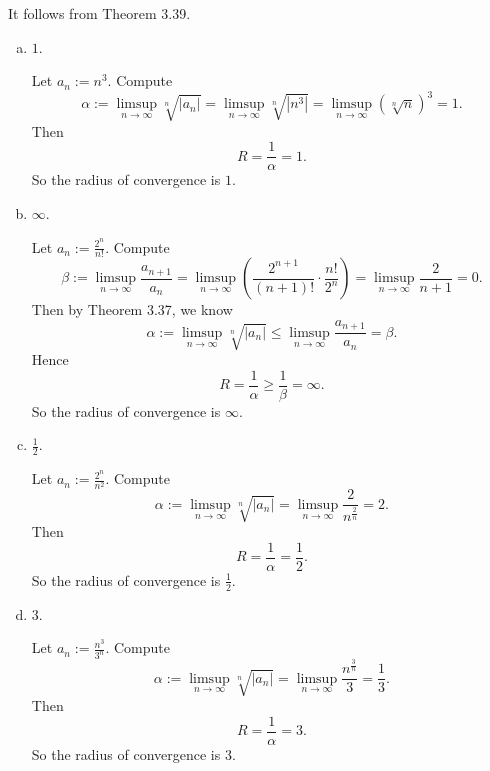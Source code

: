 \begin{Exercise}
	It follows from Theorem 3.39.
	\begin{enumerate}[(a)]
		\item
		\begin{answer}
			$1$.
		\end{answer}
		\begin{solution}
			Let $a_n := n^3$. Compute
			$$
			\alpha := \limsup_{n\to\infty} \sqrt[n]{|a_n|}
			= \limsup_{n\to\infty} \sqrt[n]{|n^3|}
			=\limsup_{n\to\infty} (\sqrt[n]{n})^3
			= 1.
			$$
			Then
			$$
			R = \frac{1}{\alpha}
			= 1.
			$$
			So the radius of convergence is $1$.
		\end{solution}
		
		\item
		\begin{answer}
			$\infty$.
		\end{answer}
		\begin{solution}
			Let $a_n := \frac{2^n}{n!}$.
			Compute
			$$
			\beta := \limsup_{n\to\infty}\frac{a_{n+1}}{a_n}
			= \limsup_{n\to\infty}\left( \frac{2^{n+1}}{(n+1)!} \cdot \frac{n!}{2^n} \right) 
			= \limsup_{n\to\infty} \frac{2}{n+1}
			= 0.
			$$
			Then by Theorem 3.37, we know
			$$
			\alpha := \limsup_{n\to\infty} \sqrt[n]{|a_n|} 
			\leq \limsup_{n\to\infty}\frac{a_{n+1}}{a_n} 
			= \beta.
			$$
			Hence
			$$
			R = \frac{1}{\alpha} \geq \frac{1}{\beta} = \infty.
			$$
			So the radius of convergence is $\infty$.
		\end{solution}
		
		\item
		\begin{answer}
			$\frac{1}{2}$.
		\end{answer}
		\begin{solution}
			Let $a_n := \frac{2^n}{n^2}$. 
			Compute
			$$
			\alpha := \limsup_{n\to\infty} \sqrt[n]{|a_n|} 
			= \limsup_{n\to\infty}\frac{2}{n^{\frac{2}{n}}}
			= 2.
			$$
			Then 
			$$
			R = \frac{1}{\alpha}
			= \frac{1}{2}.
			$$
			So the radius of convergence is $\frac{1}{2}$.
		\end{solution}
		
		\item
		\begin{answer}
			$3$.
		\end{answer}
		\begin{solution}
			Let $a_n := \frac{n^3}{3^n}$. 
			Compute
			$$
			\alpha := \limsup_{n\to\infty} \sqrt[n]{|a_n|} 
			= \limsup_{n\to\infty}\frac{n^{\frac{3}{n}}}{3}
			= \frac{1}{3}.
			$$
			Then
			$$
			R = \frac{1}{\alpha}
			= 3.
			$$
			So the radius of convergence is $3$.
		\end{solution}
	\end{enumerate}
\end{Exercise}